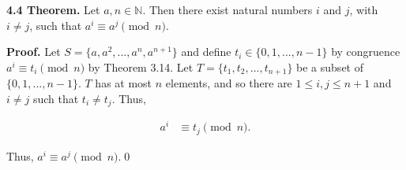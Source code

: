 \documentclass[12pt]{article}
\begin{document}
\noindent\textbf{4.4 Theorem.} Let $a,n\in\mathbb{N}$. Then there exist natural numbers $i$ and $j$, with $i\not= j$, such that $a^i\equiv a^j\pmod n$. 

\bigskip

\noindent\textbf{Proof.} Let $S=\{ a,a^2,...,a^n,a^{n+1} \}$ and define $t_i\in\{ 0,1,...,n-1 \}$ by congruence $a^i\equiv t_i\pmod n$ by Theorem 3.14. Let $T=\{ t_1,t_2,...,t_{n+1} \}$ be a subset of $\{0,1,...,n-1 \}$. $T$ has at most $n$ elements, and so there are $1\leq i,j \leq n+1$ and $i\not= j$ such that $t_i\not= t_j$. Thus,

\begin{align*}
a^i &\equiv t_j\pmod n.
\end{align*}

\noindent Thus, $a^i\equiv a^j\pmod n$.\qed
\end{document}
